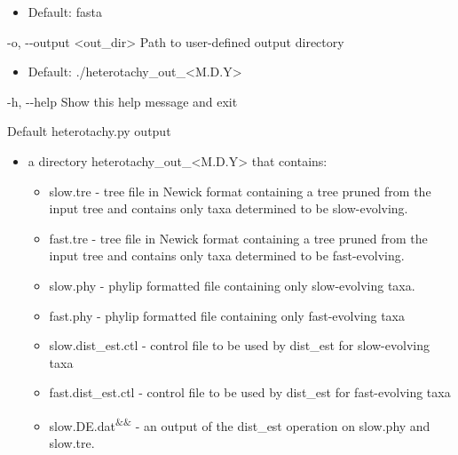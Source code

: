 \documentclass{article}
\begin{document}
\begin{description}
\begin{description}
\begin{description}
\begin{itemize}
                        \item Default: fasta
                    \end{itemize}
                    \item -o, -\/-output \hspace{0.2cm} <out\_dir> \hspace{0.2cm} Path to user-defined output directory
                    \begin{itemize}
                        \item Default: ./heterotachy\_out\_<M.D.Y>
                    \end{itemize}
                    \item -h, -\/-help \hspace{0.2cm} Show this help message and exit
                \end{description}
            \end{description}
             \vspace{0.2cm}
             \begin{description}
                 \item Default heterotachy.py output
                 \begin{itemize}
                    \item a directory heterotachy\_out\_<M.D.Y> that contains:
                    \begin{itemize}
                        \item  slow.tre - tree file in Newick format containing a tree pruned from the input tree and contains only taxa determined to be slow-evolving.
                        \item  fast.tre - tree file in Newick format containing a tree pruned from the input tree and contains only taxa determined to be fast-evolving. 
                        \item  slow.phy - phylip formatted file containing only slow-evolving taxa.
                        \item  fast.phy - phylip formatted file containing only fast-evolving taxa
                        \item  slow.dist\_est.ctl - control file to be used by dist\_est for slow-evolving taxa
                        \item  fast.dist\_est.ctl - control file to be used by dist\_est for fast-evolving taxa
                        \item  slow.DE.dat\textsuperscript{\&\&} - an output of the dist\_est operation on slow.phy and slow.tre.

\end{itemize}
\end{itemize}
\end{description}
\end{description}
\end{document}
